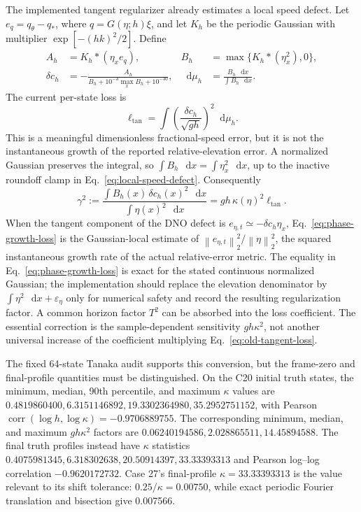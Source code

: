 \documentclass[11pt]{article}
\newcommand{\dd}{\mathop{}\!\mathrm{d}}
\newcommand{\norm}[1]{\left\lVert #1\right\rVert}
\begin{document}
The implemented tangent regularizer already estimates a local speed defect.
Let \(e_q=q_\theta-q_*\), where \(q=G(\eta;h)\xi\), and let \(K_h\) be the
periodic Gaussian with multiplier \(\exp[-(hk)^2/2]\).  Define
\begin{align}
 A_h &=K_h*(\eta_xe_q),
 &B_h&=\max\{K_h*(\eta_x^2),0\},\nonumber\\
 \delta c_h&=-\frac{A_h}{B_h+10^{-3}\max_x B_h+10^{-30}},
 &\dd\mu_h&=\frac{B_h\,\dd x}{\int B_h\,\dd x}.
 \label{eq:local-speed-defect}
\end{align}
The current per-state loss is
\begin{equation}
 \ell_{\mathrm{tan}}
 =\int\left(\frac{\delta c_h}{\sqrt{gh}}\right)^2\dd\mu_h.
 \label{eq:old-tangent-loss}
\end{equation}
This is a meaningful dimensionless fractional-speed error, but it is not the
instantaneous growth of the reported relative-elevation error.  A normalized
Gaussian preserves the integral, so
\(\int B_h\,\dd x=\int\eta_x^2\,\dd x\), up to the inactive roundoff clamp in
Eq.~\eqref{eq:local-speed-defect}.  Consequently
\begin{equation}
 \boxed{
 \gamma^2
 :=\frac{\int B_h(x)\,\delta c_h(x)^2\,\dd x}
        {\int\eta(x)^2\,\dd x}
 =gh\,\kappa(\eta)^2\ell_{\mathrm{tan}} .}
 \label{eq:phase-growth-loss}
\end{equation}
When the tangent component of the DNO defect is
\(e_{\eta,t}\simeq-\delta c_h\eta_x\), Eq.~\eqref{eq:phase-growth-loss} is the
Gaussian-local estimate of
\(\norm{e_{\eta,t}}_2^2/\norm{\eta}_2^2\), the squared instantaneous growth
rate of the actual relative-error metric.  The equality in
Eq.~\eqref{eq:phase-growth-loss} is exact for the stated continuous normalized
Gaussian; the implementation should replace the elevation denominator by
\(\int\eta^2\,\dd x+\varepsilon_\eta\) only for numerical safety and record the
resulting regularization factor.  A common horizon factor \(T^2\) can be
absorbed into the loss coefficient.  The essential correction is the
sample-dependent sensitivity \(gh\kappa^2\), not another universal increase
of the coefficient multiplying Eq.~\eqref{eq:old-tangent-loss}.

The fixed 64-state Tanaka audit supports this conversion, but the frame-zero
and final-profile quantities must be distinguished.  On the C20 initial truth
states, the minimum, median, 90th percentile, and maximum \(\kappa\) values are
\(0.4819860400,6.3151146892,19.3302364980,35.2952751152\), with Pearson
\(\operatorname{corr}(\log h,\log\kappa)=-0.9706889755\).  The corresponding
minimum, median, and maximum \(gh\kappa^2\) factors are
\(0.06240194586,2.028865511,14.45894588\).  The final truth profiles instead
have \(\kappa\) statistics
\(0.4075981345,6.318302638,20.50914397,33.33393313\) and Pearson log--log
correlation \(-0.9620172732\).  Case 27's final-profile
\(\kappa=33.33393313\) is the value relevant to its shift tolerance:
\(0.25/\kappa=0.00750\), while exact periodic Fourier translation and
bisection give 0.007566.
\end{document}
